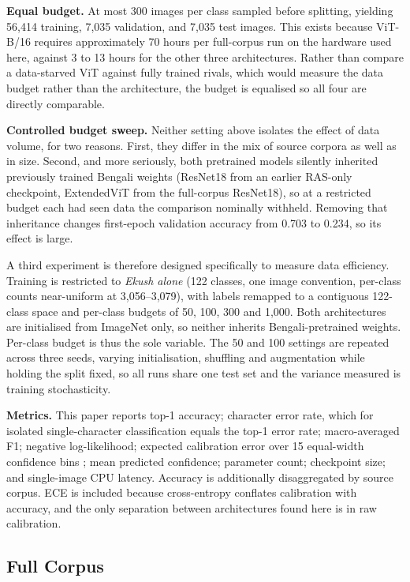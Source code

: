 \textbf{Equal budget.} At most 300 images per class sampled before
splitting, yielding 56,414 training, 7,035 validation, and 7,035 test
images. This exists because ViT-B/16 requires approximately 70 hours per
full-corpus run on the hardware used here, against 3 to 13 hours for the other
three architectures. Rather than compare a data-starved ViT against
fully trained rivals, which would measure the data budget rather than
the architecture, the budget is equalised so all four are directly
comparable.

\textbf{Controlled budget sweep.} Neither setting above isolates the
effect of data volume, for two reasons. First, they differ in the mix of
source corpora as well as in size. Second, and more seriously, both pretrained models silently inherited previously trained Bengali
weights (ResNet18 from an earlier RAS-only checkpoint, ExtendedViT
from the full-corpus ResNet18), so at a restricted budget each had
seen data the comparison nominally withheld. Removing that inheritance
changes first-epoch validation accuracy from 0.703 to 0.234, so its
effect is large.

A third experiment is therefore designed specifically to measure data efficiency. Training is restricted to \emph{Ekush alone} (122
classes, one image convention, per-class counts near-uniform at
3,056--3,079), with labels remapped to a contiguous 122-class space and
per-class budgets of 50, 100, 300 and 1,000. Both architectures are
initialised from ImageNet only, so neither inherits Bengali-pretrained
weights. Per-class budget is thus the sole variable. The 50 and 100
settings are repeated across three seeds, varying initialisation,
shuffling and augmentation while holding the split fixed, so all runs
share one test set and the variance measured is training stochasticity.

\textbf{Metrics.} This paper reports top-1 accuracy; character error rate, which
for isolated single-character classification equals the top-1 error
rate; macro-averaged F1; negative log-likelihood; expected calibration
error over 15 equal-width confidence bins \citep{ref52}; mean predicted confidence;
parameter count; checkpoint size; and single-image CPU latency. Accuracy
is additionally disaggregated by source corpus. ECE is included because cross-entropy conflates calibration with accuracy, and the only separation between architectures found here is in raw calibration.


\hypertarget{full-corpus}{%
\subsection{Full Corpus}\label{full-corpus}}

